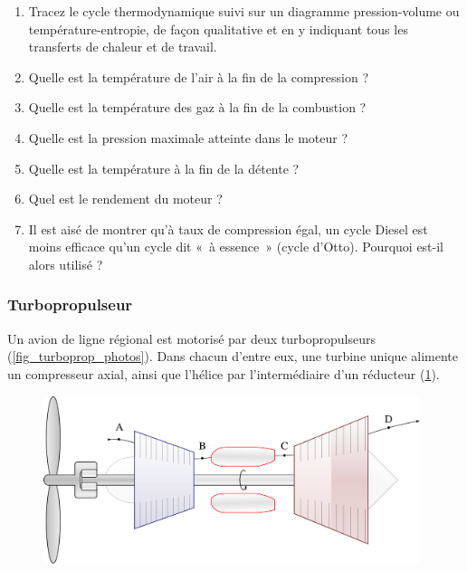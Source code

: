 	\begin{enumerate}
		\item Tracez le cycle thermodynamique suivi sur un diagramme pression-volume ou température-entropie, de façon qualitative et en y indiquant tous les transferts de chaleur et de travail.
		\item Quelle est la température de l’air à la fin de la compression ?
		\item Quelle est la température des gaz à la fin de la combustion ?
		\item Quelle est la pression maximale atteinte dans le moteur ?
		\item Quelle est la température à la fin de la détente ?
		\item Quel est le rendement du moteur ?
		\item Il est aisé de montrer qu’à taux de compression égal, un cycle Diesel est moins efficace qu’un cycle dit «~à essence~» (cycle d’Otto). Pourquoi est-il alors utilisé ?
	\end{enumerate}


\subsubsection{Turbopropulseur}
\label{exo_cycle_turbopropulseur}
	
	Un avion de ligne régional est motorisé par deux turbopropulseurs (\cref{fig_turboprop_photos}). Dans chacun d’entre eux, une turbine unique alimente un compresseur axial, ainsi que l’hélice par l’intermédiaire d’un réducteur (\cref{fig_turboprop_circuit}).
	
	\begin{figure}
		\begin{center}
			\includegraphics[width=11cm]{images/circuit_turboprop.png}
		\end{center}
		\label{fig_turboprop_circuit}
	\end{figure}
	
